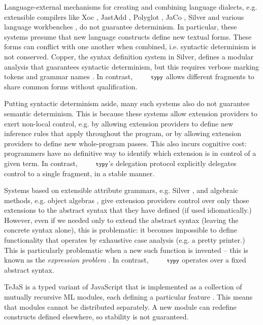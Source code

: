 \documentclass[10pt]{sigplanconf}
\newcommand{\typy}{\texttt{\footnotesize typy}}
\begin{document}
Language-external mechanisms for creating and combining language dialects, e.g. extensible compilers like Xoc \cite{conf/asplos/CoxBCKK08}, JastAdd \cite{Ekman:2007:JEJ:1297027.1297029}, Polyglot \cite{Nystrom-Clarkson-Myers03}, JaCo \cite{zenger2001implementing}, Silver \cite{VanWyk:2010:SEA} and various language workbenches \cite{erdweg2013state}, do not guarantee determinism. In particular, these systems presume that new language constructs define new textual forms. These forms can conflict with one another when combined, i.e. syntactic determinism is not conserved. Copper, the syntax definition system in Silver, defines a modular analysis that guarantees syntactic determinism, but this requires verbose marking tokens and grammar names \cite{conf/pldi/SchwerdfegerW09}. In contrast, $\typy$ allows  different fragments to share common forms without qualification.

Putting syntactic determinism aside, many such systems also do not guarantee semantic determinism. This is because these systems allow extension providers to exert non-local control, e.g. by allowing extension providers to define new inference rules that apply throughout the program, or by allowing extension providers to define new whole-program passes. This also incurs cognitive cost: programmers have no definitive way to identify which extension is in control of a given term. In contrast, $\typy$'s delegation protocol explicitly delegates control to a single fragment, in a stable manner.

Systems based on extensible attribute grammars, e.g. Silver \cite{VanWyk:2010:SEA}, and algebraic methods, e.g. object algebras \cite{oliveira2012extensibility}, give extension providers control over only those extensions to the abstract syntax that they have defined (if used idiomatically.) However, even if we needed only to extend the abstract syntax (leaving the concrete syntax alone), this is problematic: it becomes impossible to define functionality that operates by exhaustive case analysis (e.g. a pretty printer.) This is particularly problematic when a new such function is invented -- this is known as the \emph{expression problem} \cite{wadler1998expression,Reynolds75}. In contrast, $\typy$ operates over a fixed abstract syntax.

TeJaS is a typed variant of JavaScript that is implemented as a collection of mutually recursive ML modules, each defining a particular feature \cite{DBLP:conf/dls/LernerPGK13}. This means that modules cannot be distributed separately. A new module can redefine constructs defined elsewhere, so stability is not guaranteed.
\end{document}
